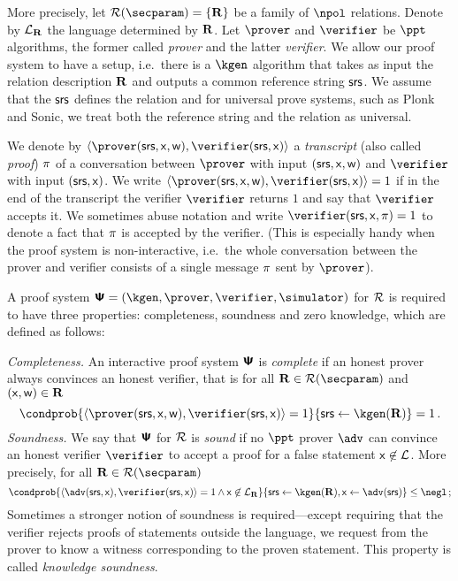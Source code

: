 \documentclass[runningheads,11pt]{llncs}
\newcommand{\ourpar}[1] {\smallskip\noindent\emph{#1}}
\begin{document}
More precisely, let $\RELGEN(\secparam) = \smallset{\REL}$ be a family of
$\npol$ relations. Denote by $\mathcal{L}_{\mathbf{R}}$ the language determined by $\mathbf{R}$. Let
$\prover$ and $\verifier$ be $\ppt$ algorithms, the former called \emph{prover}
and the latter \emph{verifier}. We allow our proof system to have a setup,
i.e.~there is a $\kgen$ algorithm that takes as input the relation description
$\mathbf{R}$ and outputs a common reference string $\mathsf{srs}$. We assume that the $\mathsf{srs}$
defines the relation and for universal prove systems, such as Plonk and Sonic,
we treat both the reference string and the relation as universal.

We denote by
$\ip{\prover(\srs, \inp, \wit)}{\verifier(\srs,\inp)}$ a
\emph{transcript} (also called \emph{proof}) $\pi$ of a conversation
between $\prover$ with input $(\mathsf{srs}, \mathsf{x}, \mathsf{w})$ and $\verifier$ with
input $(\mathsf{srs}, \mathsf{x})$. We write
$\ip{\prover (\srs, \inp, \wit)}{\verifier(\srs, \inp)} = 1$ if in
the end of the transcript the verifier $\verifier$ returns $1$ and say that
$\verifier$ accepts it. We sometimes abuse notation and write
$\verifier(\srs, \inp, \zkproof) = 1$ to denote a fact that $\pi$ is
accepted by the verifier. (This is especially handy when the proof system is
non-interactive, i.e.~the whole conversation between the prover and verifier
consists of a single message $\pi$ sent by $\prover$).

A proof system $\proofsystem = (\kgen, \prover, \verifier, \simulator)$ for
$\mathcal{R}$ is required to have three properties: completeness, soundness and zero
knowledge, which are defined as follows:

\ourpar{Completeness.}
  An interactive proof system $\bm{\mathsf{\Psi}}$ is
  \emph{complete} if an honest prover always convinces an honest verifier, that
  is for all $\REL \in \RELGEN(\secparam)$ and $(\mathsf{x}, \mathsf{w}) \in \mathbf{R}$
	\[
		\condprob{\ip{\prover (\srs, \inp, \wit)}{\verifier (\srs,
        \inp)} = 1}{\srs \gets \kgen(\REL)} = 1\,.
	\]
\ourpar{Soundness.}
    We say that $\bm{\mathsf{\Psi}}$ for $\mathcal{R}$ is \emph{sound} if no
  $\ppt$ prover $\adv$ can convince an honest verifier $\verifier$ to accept a
  proof for a false statement $\mathsf{x} \not\in\mathcal{L}$. More precisely, for
  all $\REL \in \RELGEN(\secparam)$
	\[
    \condprob{\ip{\adv(\srs, \inp)}{\verifier(\srs, \inp)} = 1 \land \inp
      \not\in \LANG_\REL}{\srs \gets \kgen(\REL), \inp \gets \adv(\srs)} \leq
    \negl\,;
	\]
Sometimes a stronger notion of soundness is required---except requiring that the
verifier rejects proofs of statements outside the language, we request from the
prover to know a witness corresponding to the proven statement. This property is
called \emph{knowledge soundness}.%
\end{document}
